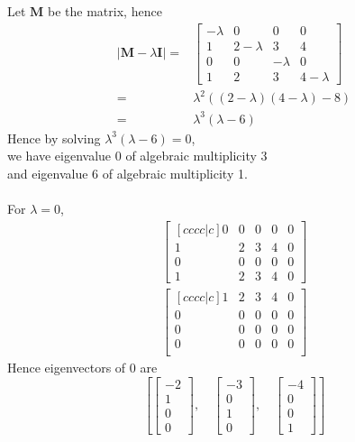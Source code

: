 \documentclass[12pt]{article}
\newcommand{\matr}[1]{\bm{#1}}
\newenvironment{answer}[2][Answer]{\begin{trivlist}
    \item[\hskip \labelsep {\bfseries #1}\hskip \labelsep {\bfseries #2.}]}{\end{trivlist}}
\begin{document}
\begin{answer}{Q. 4}\end{answer}
Let $\matr M$ be the matrix, hence
\begin{align}
    |\matr M - \lambda \matr I| =&  
    \begin{bmatrix}
    -\lambda & 0 & 0 & 0 \\
    1 & 2- \lambda & 3 & 4 \\
    0 & 0 & -\lambda & 0 \\
    1 & 2 & 3 & 4-\lambda
    \end{bmatrix} \\
    =&\lambda ^2((2-\lambda)(4-\lambda)-8) \\ 
    =& \lambda ^3(\lambda -6)
\end{align}
Hence by solving $\lambda ^3 (\lambda -6)=0$, \\
we have eigenvalue $0$ of algebraic multiplicity 3 \\
and eigenvalue $6$ of algebraic multiplicity 1. \\ \\
For $\lambda = 0$,
\begin{align}
    \begin{bmatrix}[cccc|c]
    0 & 0 & 0 & 0& 0 \\
    1 & 2 & 3 & 4& 0 \\
    0 & 0 & 0 & 0& 0 \\
    1 & 2 & 3 & 4& 0
    \end{bmatrix} \\
    \begin{bmatrix}[cccc|c]
    1 & 2 & 3 & 4& 0 \\
    0 & 0 & 0 & 0& 0 \\
    0 & 0 & 0 & 0& 0 \\
    0 & 0 & 0 & 0& 0 \\
    \end{bmatrix} 
\end{align}
Hence eigenvectors of 0 are
\begin{equation}
    \left [ \left[\begin{matrix}-2\\1\\0\\0\end{matrix}\right], \quad \left[\begin{matrix}-3\\0\\1\\0\end{matrix}\right], \quad \left[\begin{matrix}-4\\0\\0\\1\end{matrix}\right]\right ]
\end{equation} 
\end{document}
